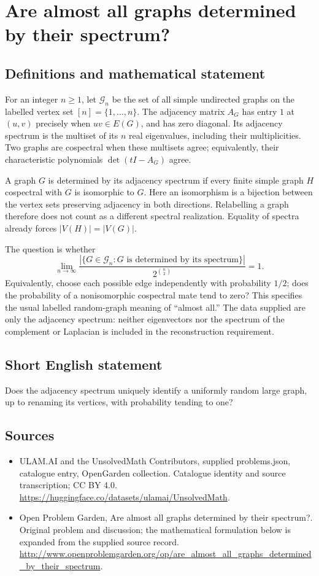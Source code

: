 \documentclass[11pt,a4paper]{article}
\begin{document}
\section*{Are almost all graphs determined by their spectrum?}\label{statement}

\subsection{Definitions and mathematical statement}
For an integer $n\geq1$, let $\mathcal G_n$ be the set of all simple
undirected graphs on the labelled vertex set $[n]=\{1,\ldots,n\}$.
The adjacency matrix $A_G$ has entry $1$ at $(u,v)$ precisely when
$uv\in E(G)$, and has zero diagonal. Its adjacency spectrum is the
multiset of its $n$ real eigenvalues, including their multiplicities.
Two graphs are cospectral when these multisets agree; equivalently,
their characteristic polynomials $\det(tI-A_G)$ agree.

A graph $G$ is determined by its adjacency spectrum if every finite
simple graph $H$ cospectral with $G$ is isomorphic to $G$. Here an
isomorphism is a bijection between the vertex sets preserving adjacency
in both directions. Relabelling a graph therefore does not count as a
different spectral realization. Equality of spectra already forces
$|V(H)|=|V(G)|$.

The question is whether
\[
 \lim_{n\to\infty}
 \frac{|\{G\in\mathcal G_n:G\text{ is determined by its spectrum}\}|}
 {2^{\binom n2}}=1.
\]
Equivalently, choose each possible edge independently with probability
$1/2$; does the probability of a nonisomorphic cospectral mate tend to
zero? This specifies the usual labelled random-graph meaning of
``almost all.'' The data supplied are only the adjacency spectrum:
neither eigenvectors nor the spectrum of the complement or Laplacian
is included in the reconstruction requirement.
\subsection{Short English statement}
Does the adjacency spectrum uniquely identify a uniformly random large graph, up to renaming its vertices, with probability tending to one?
\subsection{Sources}
\begin{itemize}
\item[S1] ULAM.AI and the UnsolvedMath Contributors, supplied problems.json, catalogue entry, OpenGarden collection. Catalogue identity and source transcription; CC BY 4.0.
\url{https://huggingface.co/datasets/ulamai/UnsolvedMath}.
\item[S2] Open Problem Garden, Are almost all graphs determined by their spectrum?. Original problem and discussion; the mathematical formulation below is expanded from the supplied source record.
\url{http://www.openproblemgarden.org/op/are_almost_all_graphs_determined_by_their_spectrum}.
\end{itemize}
\end{document}
